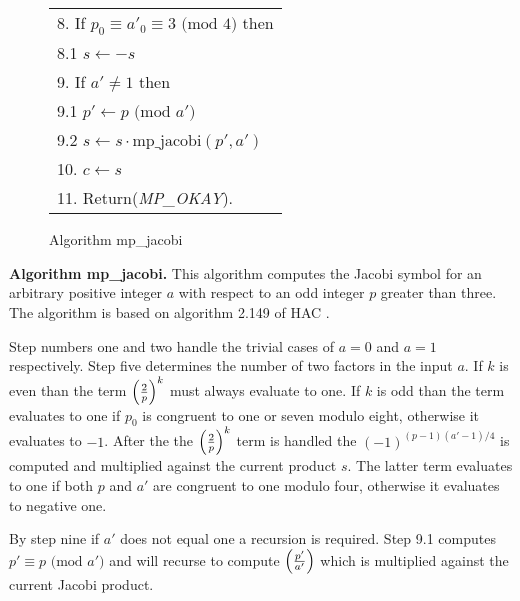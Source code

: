 \documentclass[b5paper]{book}
\begin{document}
\begin{figure}[!here]
\begin{small}
\begin{center}
\begin{tabular}{l}
8.  If $p_0 \equiv a'_0 \equiv 3 \mbox{ (mod }4\mbox{)}$ then \\
\hspace{3mm}8.1  $s \leftarrow -s$ \\
9.  If $a' \ne 1$ then \\
\hspace{3mm}9.1  $p' \leftarrow p \mbox{ (mod }a'\mbox{)}$ \\
\hspace{3mm}9.2  $s \leftarrow s \cdot \mbox{mp\_jacobi}(p', a')$ \\
10.  $c \leftarrow s$ \\
11.  Return(\textit{MP\_OKAY}). \\
\hline
\end{tabular}
\end{center}
\end{small}
\caption{Algorithm mp\_jacobi}
\end{figure}
\textbf{Algorithm mp\_jacobi.}
This algorithm computes the Jacobi symbol for an arbitrary positive integer $a$ with respect to an odd integer $p$ greater than three.  The algorithm
is based on algorithm 2.149 of HAC \cite[pp. 73]{HAC}.  

Step numbers one and two handle the trivial cases of $a = 0$ and $a = 1$ respectively.  Step five determines the number of two factors in the
input $a$.  If $k$ is even than the term $\left ( { 2 \over p } \right )^k$ must always evaluate to one.  If $k$ is odd than the term evaluates to one 
if $p_0$ is congruent to one or seven modulo eight, otherwise it evaluates to $-1$. After the the $\left ( { 2 \over p } \right )^k$ term is handled 
the $(-1)^{(p-1)(a'-1)/4}$ is computed and multiplied against the current product $s$.  The latter term evaluates to one if both $p$ and $a'$ 
are congruent to one modulo four, otherwise it evaluates to negative one.

By step nine if $a'$ does not equal one a recursion is required.  Step 9.1 computes $p' \equiv p \mbox{ (mod }a'\mbox{)}$ and will recurse to compute
$\left ( {p' \over a'} \right )$ which is multiplied against the current Jacobi product.
\end{document}
